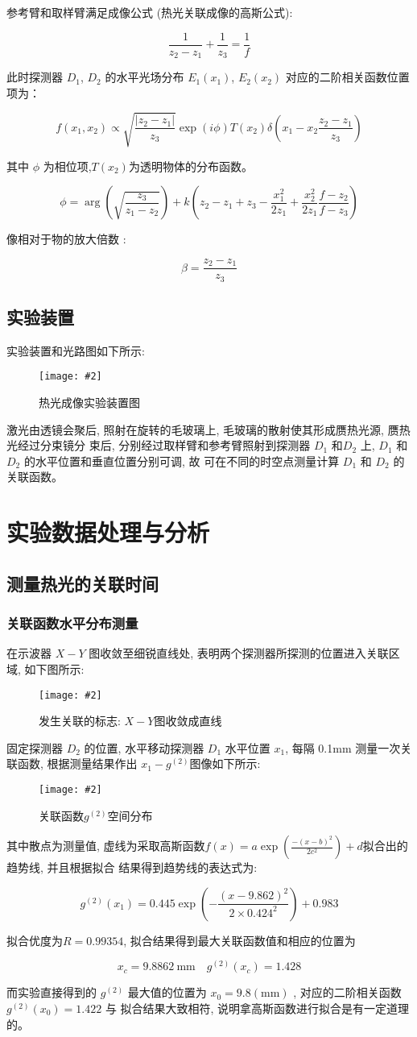 \documentclass[12pt,a4paper]{article}
\newcommand{\be}[1]{
    \begin{equation}
        #1
    \end{equation}
}
\newcommand{\bfig}[3]{
    \begin{figure}[H]
        \centering
        \texttt{[image: \#2]}
        \caption{#3}
    \end{figure}
}
\begin{document}
参考臂和取样臂满足成像公式 (热光关联成像的高斯公式):
\be{\frac{1}{z_{2}-z_{1}}+\frac{1}{z_{3}}=\frac{1}{f}}

此时探测器 $D_1$, $D_2$ 的水平光场分布 $E_1(x_1)$, $E_2(x_2)$ 对应的二阶相关函数位置项为：
\be{f\left(x_{1}, x_{2}\right) \propto \sqrt{\frac{\left|z_{2}-z_{1}\right|}{z_{3}}} \exp (i \phi) T\left(x_{2}\right) \delta\left(x_{1}-x_{2} \frac{z_{2}-z_{1}}{z_{3}}\right)}
其中 $\phi$ 为相位项,$T(x_2) $为透明物体的分布函数。
\be{\phi=\arg \left(\sqrt{\frac{z_{3}}{z_{1}-z_{2}}}\right)+k\left(z_{2}-z_{1}+z_{3}-\frac{x_{1}^{2}}{2 z_{1}}+\frac{x_{2}^{2}}{2 z_{1}} \frac{f-z_{2}}{f-z_{3}}\right)}
像相对于物的放大倍数\cite{cao2005geometrical}
:
\be{\beta=\frac{z_{2}-z_{1}}{z_{3}}}
\subsection{实验装置}
实验装置和光路图如下所示:
\bfig{0.8}{热光成像实验装置图.png}{热光成像实验装置图}
激光由透镜会聚后, 照射在旋转的毛玻璃上, 毛玻璃的散射使其形成赝热光源, 赝热光经过分束镜分
束后, 分别经过取样臂和参考臂照射到探测器 $D_1$ 和$ D_2$ 上, $D_1$ 和 $D_2$ 的水平位置和垂直位置分别可调, 故
可在不同的时空点测量计算 $D_1$ 和 $D_2$ 的关联函数。
\section{实验数据处理与分析}
\subsection{测量热光的关联时间}
\subsubsection{关联函数水平分布测量}
在示波器 $X − Y$ 图收敛至细锐直线处, 表明两个探测器所探测的位置进入关联区域, 如下图所示: 
\bfig{0.5}{x-y图.jpg}{发生关联的标志: $X-Y$图收敛成直线}
固定探测器 $D_2$ 的位置, 水平移动探测器 $D_1$ 水平位置 $x_1$, 每隔
0.1mm 测量一次关联函数, 根据测量结果作出 $x_1 − g^{(2)}$图像如下所示:
\bfig{0.5}{空间关联.png}{关联函数$g^{(2)}$空间分布}
其中散点为测量值, 虚线为采取高斯函数$f(x)=a \exp \left(\frac{-\left(x-b\right)^{2}}{2 c^{2}}\right)+d$拟合出的趋势线, 并且根据拟合
结果得到趋势线的表达式为:
\be{g^{(2)}(x_1)= 0.445 \exp{(-\frac{(x-9.862)^2}{2 \times  0.424^2})}+0.983}
拟合优度为$R=0.99354$, 拟合结果得到最大关联函数值和相应的位置为
\be{x_{c}=9.8862\mathrm{~mm} \quad g^{(2)}\left(x_{c}\right)=1.428}
而实验直接得到的 $g^{(2)}$ 最大值的位置为 $x_0 = 9.8(\mathrm{mm})$ , 对应的二阶相关函数 $g^{(2)}(x_0) = 1.422$ 与
拟合结果大致相符, 说明拿高斯函数进行拟合是有一定道理的。
\end{document}
